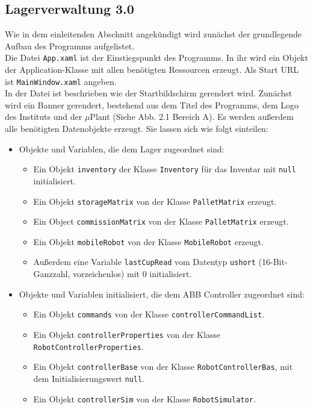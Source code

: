     \subsection {Lagerverwaltung 3.0}

    Wie in dem einleitenden Abschnitt angekündigt wird zunächst der grundlegende Aufbau des Programms aufgelistet.
    \\
    Die Datei \verb|App.xaml| ist der Einstiegspunkt des Programms.
    In ihr wird ein Objekt der Application-Klasse mit allen benötigten Ressourcen erzeugt.
    Als Start URL ist \verb|MainWindow.xaml| angeben.
    \\
    In der Datei ist beschrieben wie der Startbildschirm gerendert wird.
    Zunächst wird ein Banner gerendert, bestehend aus dem Titel des Programms, dem Logo des Instituts und der $\mu$Plant
    (Siehe Abb. 2.1 Bereich \glqq A\grqq).
    Es werden außerdem alle benötigten Datenobjekte erzeugt.
    Sie lassen sich wie folgt einteilen:
    \\
    \begin{itemize}
        \item Objekte und Variablen, die dem Lager zugeordnet sind:
            \begin{itemize}
                \item Ein Objekt \verb|inventory| der Klasse \verb|Inventory| für das Inventar mit \verb|null| initialisiert.
                \item Ein Objekt \verb|storageMatrix| von der Klasse \verb|PalletMatrix| erzeugt.
                \item Ein Object \verb|commissionMatrix| von der Klasse \verb|PalletMatrix| erzeugt.
                \item Ein Objekt \verb|mobileRobot| von der Klasse \verb |MobileRobot| erzeugt.
                \item Außerdem eine Variable \verb|lastCupRead| vom Datentyp \verb|ushort| (16-Bit-Ganzzahl, vorzeichenlos) mit 0 initialisiert.
            \end{itemize}
            \item Objekte und Variablen initialisiert, die dem ABB Controller zugeordnet sind:
            \begin{itemize}
                \item Ein Objekt \verb|commands| von der Klasse \verb|controllerCommandList|.
                \item Ein Objekt \verb|controllerProperties| von der Klasse \verb|RobotControllerProperties|.
                \item Ein Objekt \verb|controllerBase| von der Klasse \verb|RobotControllerBas|, mit dem Initialisierungswert \verb|null|.
                \item Ein Objekt \verb|controllerSim| von der Klasse \verb|RobotSimulator|.
            \end{itemize}
    \end{itemize}
